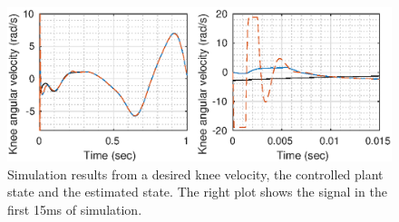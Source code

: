 \documentclass[letterpaper, 10 pt, conference]{ieeeconf}  %
\theoremstyle{plain}
\theoremstyle{definition}
\theoremstyle{remark}
\begin{document}
%
%
%
%
\begin{figure}[h!]
	\begin{center}
	\includegraphics[width = \columnwidth]{Figs/dq_knee_mu_fix_1e-03.eps}
	\caption{Simulation results from a desired knee velocity, the controlled plant state and the estimated state. The right plot shows the signal in the first 15ms of simulation.}
	\label{fig:dknee}
	\end{center}
\end{figure}
%
%
%
\end{document}
